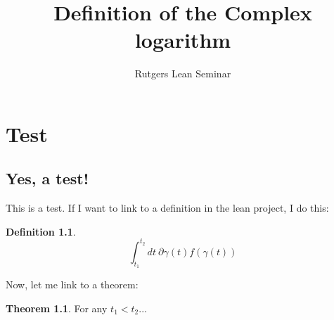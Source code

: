 \documentclass{report}
\title{Definition of the Complex logarithm}
\author{Rutgers Lean Seminar}
\theoremstyle{definition}
\newtheorem{definition}{Definition}
\newtheorem{theorem}{Theorem}
\begin{document}
\maketitle

\chapter{Test}

\section{Yes, a test!}

This is a test.
If I want to link to a definition in the lean project, I do this:
\begin{definition}
  \label{def:curvint}
  $$
    \int_{t_1}^{t_2}dt\ \partial\gamma(t)f(\gamma(t))
  $$
\end{definition}

Now, let me link to a theorem:
\begin{theorem}
  \label{theo:hasDerivAt_curvint}
  For any $t_1<t_2$...
\end{theorem}
\end{document}

